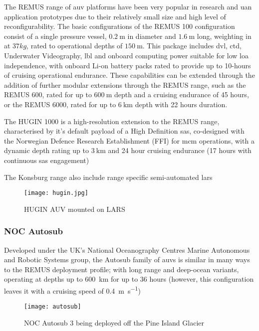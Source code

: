 The REMUS range of \gls{auv} platforms have been very popular in research and \gls{uan} application prototypes due to their relatively small size and high level of reconfigurability.
The basic configurations of the REMUS 100 configuration consist of a single pressure vessel, $\SI{0.2}{\meter}$ in diameter and $\SI{1.6}{\meter}$ long, weighting in at $37kg$, rated to operational depths of $\SI{150}{\meter}$. 
This package includes \gls{dvl}, \gls{ctd}, Underwater Videography, \gls{lbl} and onboard computing power suitable for low \gls{loa} independence, with onboard Li-on battery packs rated to provide up to 10-hours of cruising operational endurance.
These capabilities can be extended through the addition of further modular extensions through the REMUS range, such as the REMUS 600, rated for up to $\SI{600}{\meter}$ depth and a cruising endurance of 45 hours, or the REMUS 6000, rated for up to $\SI{6}{\kilo\meter}$ depth with 22 hours duration.

The HUGIN 1000 is a high-resolution extension to the REMUS range, characterised by it's default payload of a High Definition \gls{sas}, co-designed with the Norwegian Defence Research Establishment (FFI) for \gls{mcm} operations, with a dynamic depth rating up to $\SI{3}{\kilo\meter}$ and 24 hour cruising endurance (17 hours with continuous \gls{sas} engagement)

The Konsburg range also include range specific semi-automated \gls{lars}
\begin{figure}[h]
	\centering
	\texttt{[image: hugin.jpg]}
	\caption{\label{fig:hugin}HUGIN AUV mounted on LARS}
\end{figure}
\subsubsection{NOC Autosub}

Developed under the UK's National Oceanography Centres Marine Autonomous and Robotic Systems group, the Autosub family of \glspl{auv} is similar in many ways to the REMUS deployment profile; with long range and deep-ocean variants, operating at depths up to \SI{600}{\kilo\meter} for up to 36 hours (however, this configuration leaves it with a cruising speed of \SI{0.4}{\meter\per\second})
\begin{figure}[h]
	\centering
	\texttt{[image: autosub]}
	\caption{\label{fig:autosub}NOC Autosub 3 being deployed off the Pine Island Glacier}
\end{figure}

